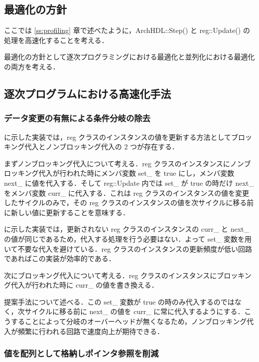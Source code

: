 \subsection{最適化の方針}

ここでは \ref{ss:profiling} 章で述べたように，ArchHDL::Step() と
reg::Update() の処理を高速化することを考える．

最適化の方針として逐次プログラミングにおける最適化と並列化における最適化の両方を考える．

\subsection{逐次プログラムにおける高速化手法}

\subsubsection{データ変更の有無による条件分岐の除去 \label{sss:no_set}}

 に示した実装では，reg
クラスのインスタンスの値を更新する方法としてブロッキング代入とノンブロッキング代入の
2 つが存在する．

まずノンブロッキング代入について考える．reg
クラスのインスタンスにノンブロッキング代入が行われた時にメンバ変数 set\_
を true にし，メンバ変数 next\_ に値を代入する．そして reg::Update
内では set\_ が true の時だけ next\_ をメンバ変数 curr\_
に代入する．これは reg
クラスのインスタンスの値を変更したサイクルのみで，その reg
クラスのインスタンスの値を次サイクルに移る前に新しい値に更新することを意味する．

 に示した実装では，更新されない reg
クラスのインスタンスの curr\_ と next\_
の値が同じであるため，代入する処理を行う必要はない．よって set\_
変数を用いて不要な代入を避けている．reg
クラスのインスタンスの更新頻度が低い回路であればこの実装が効率的である．

次にブロッキング代入について考える．reg
クラスのインスタンスにブロッキング代入が行われた時に curr\_
の値を書き換える．

提案手法について述べる．この set\_ 変数が true
の時のみ代入するのではなく，次サイクルに移る前に next\_ の値を curr\_
に常に代入するようにする．こうすることによって分岐のオーバーヘッドが無くなるため，ノンブロッキング代入が頻繁に行われる回路で速度向上が期待できる．

\subsubsection{値を配列として格納しポインタ参照を削減} \label{sss:mem_copy}

